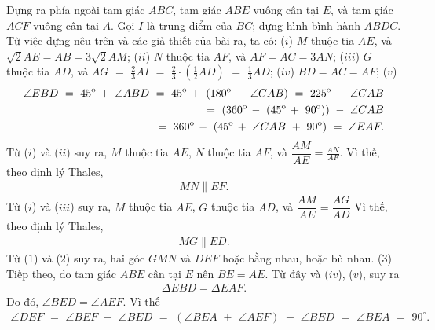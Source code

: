 \begin{multicols}{2}
	Dựng ra phía ngoài tam giác $ABC$, tam giác $ABE$ vuông cân tại $E$, và tam giác $ACF$ vuông cân tại $A$.
	\vskip 0.05cm
	Gọi $I$ là trung điểm của $BC$; dựng hình bình hành $ABDC$.
	\vskip 0.05cm
	Từ việc dựng nêu trên và các giả thiết của bài ra, ta có:
	\vskip 0.05cm
	($i$) $M$ thuộc tia $AE$, và $\sqrt{2}AE = AB = 3\sqrt{2}AM$;
	\vskip 0.05cm 
	($ii$) $N$ thuộc tia $AF$, và $AF = AC = 3AN$;
	\vskip 0.05cm
	($iii$) $G$ thuộc tia $AD$, và $AG\,\, = \,\,\frac{2}{3}AI\,\, = \,\,\frac{2}{3} \cdot \left( {\frac{1}{2}AD} \right)\,\, = \,\,\frac{1}{3}AD$;
	\vskip 0.05cm
	($iv$) $BD = AC = AF$;
	\vskip 0.05cm
	($v$)  
	\begin{align*}
		\angle EBD\,\, = \,\,{45^{\rm{o}}}\, + \,\,\angle ABD\,\, = \,\,{45^{\rm{o}}}\, + \,\,\left( {{{180}^{\rm{o}}}\, - \,\,\angle CAB} \right)\,\, = \,\,{225^{\rm{o}}}\, - \,\,\angle CAB\\
			= \,\,\left( {{{360}^{\rm{o}}}\, - \,\,\left( {{{45}^{\rm{o}}}\, + \,\,{{90}^{\rm{o}}}} \right)} \right)\,\, - \,\,\angle CAB\\
			= \,\,{360^{\rm{o}}}\, - \,\,\left( {{{45}^{\rm{o}}}\, + \,\,\angle CAB\,\, + \,\,{{90}^{\rm{o}}}} \right)\,\, = \,\,\angle EAF.
	\end{align*}
	Từ ($i$) và ($ii$) suy ra, $M$ thuộc tia $AE$, $N$ thuộc tia $AF$, và $\dfrac{AM}{AE} = \frac{AN}{AF}$. Vì thế, theo định lý Thales,
	\begin{align*}
		MN \parallel EF.       \tag{$1$}                 
	\end{align*}                          
	Từ ($i$) và ($iii$) suy ra, $M$ thuộc tia $AE$, $G$ thuộc tia $AD$, và $\dfrac{AM}{AE} = \dfrac{AG}{AD}$  Vì thế, theo định lý Thales,
	\begin{align*}
		MG \parallel ED.  \tag{$2$}
	\end{align*}                  
	Từ ($1$) và ($2$) suy ra, hai góc $GMN$ và $DEF$ hoặc bằng nhau, hoặc bù nhau.                                           \hfill  ($3$)
	\vskip 0.05cm
	Tiếp theo, do tam giác $ABE$ cân tại $E$ nên $BE = AE$. Từ đây và ($iv$), ($v$), suy ra 
	\begin{align*}
		\Delta EBD = \Delta EAF.
	\end{align*}
	Do đó, $\angle BED = \angle AEF$. Vì thế
	\begin{align*}
		\angle DEF\,\, = \,\,\angle BEF\,\, - \,\,\angle BED\,\, = \,\,\left( {\angle BEA\,\, + \,\,\angle AEF} \right)\,\, - \,\,\angle BED\,\, = \,\,\angle BEA\,\, = \,\,{90^{\circ}}. \tag{$4$}
	\end{align*}

\end{multicols}
